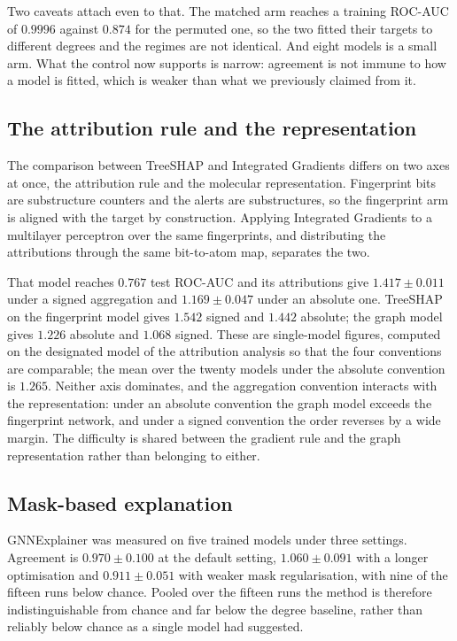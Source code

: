 \documentclass[journal=jcisd8,manuscript=suppinfo]{achemso}
\begin{document}
Two caveats attach even to that. The matched arm reaches a training ROC-AUC of $0.9996$
against $0.874$ for the permuted one, so the two fitted their targets to different degrees
and the regimes are not identical. And eight models is a small arm. What the control now
supports is narrow: agreement is not immune to how a model is fitted, which is weaker than
what we previously claimed from it.

\subsection{The attribution rule and the representation}

The comparison between TreeSHAP and Integrated Gradients differs on two axes at once, the
attribution rule and the molecular representation. Fingerprint bits are substructure counters
and the alerts are substructures, so the fingerprint arm is aligned with the target by
construction. Applying Integrated Gradients to a multilayer perceptron over the same
fingerprints, and distributing the attributions through the same bit-to-atom map, separates
the two.

That model reaches $0.767$ test ROC-AUC and its attributions give $1.417 \pm 0.011$ under a
signed aggregation and $1.169 \pm 0.047$ under an absolute one. TreeSHAP on the fingerprint
model gives $1.542$ signed and $1.442$ absolute; the graph model gives $1.226$ absolute and
$1.068$ signed. These are single-model figures, computed on the designated model of the attribution
analysis so that the four conventions are comparable; the mean over the twenty models under
the absolute convention is $1.265$. Neither axis dominates, and the aggregation convention interacts with the
representation: under an absolute convention the graph model exceeds the fingerprint network,
and under a signed convention the order reverses by a wide margin. The difficulty is shared
between the gradient rule and the graph representation rather than belonging to either.

\subsection{Mask-based explanation}

GNNExplainer was measured on five trained models under three settings. Agreement is
$0.970 \pm 0.100$ at the default setting, $1.060 \pm 0.091$ with a longer optimisation and
$0.911 \pm 0.051$ with weaker mask regularisation, with nine of the fifteen runs below chance.
Pooled over the fifteen runs the method is therefore indistinguishable from chance and far
below the degree baseline,
rather than reliably below chance as a single model had suggested.
\end{document}
